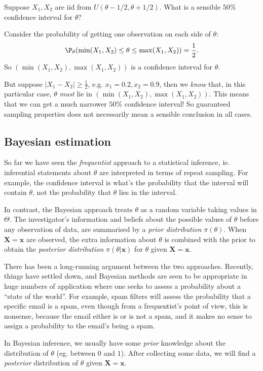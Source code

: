 \documentclass[a4paper]{article}
\begin{document}
\begin{eg}
  Suppose $X_1, X_2$ are iid from $U(\theta - 1/2, \theta + 1/2)$. What is a sensible $50\%$ confidence interval for $\theta$?

  Consider the probability of getting one observation on each side of $\theta$:
  \[
    \P_\theta(\min(X_1, X_2) \leq \theta \leq \max(X_1, X_2)) = \frac{1}{2}.
  \]
  So $(\min(X_1, X_2), \max (X_1, X_2))$ is a confidence interval for $\theta$.

  But suppose $|X_1 - X_2| \geq \frac{1}{2}$, e.g. $x_1 = 0.2, x_2 = 0.9$, then we \emph{know} that, in this particular case, $\theta$ \emph{must} lie in $(\min (X_1, X_2), \max(X_1, X_2))$. This means that we can get a much narrower $50\%$ confidence interval! So guaranteed sampling properties does not necessarily mean a sensible conclusion in all cases.
\end{eg}
\subsection{Bayesian estimation}
So far we have seen the \emph{frequentist} approach to a statistical inference, ie. inferential statements about $\theta$ are interpreted in terms of repeat sampling. For example, the confidence interval is what's the probability that the interval will contain $\theta$, not the probability that $\theta$ lies in the interval.

In contrast, the Bayesian approach treats $\theta$ as a random variable taking values in $\Theta$. The investigator's information and beliefs about the possible values of $\theta$ before any observation of data, are summarised by a \emph{prior distribution} $\pi(\theta)$. When $\mathbf{X} = \mathbf{x}$ are observed, the extra information about $\theta$ is combined with the prior to obtain the \emph{posterior distribution} $\pi(\theta|\mathbf{x})$ for $\theta$ given $\mathbf{X} = \mathbf{x}$.

There has been a long-running argument between the two approaches. Recently, things have settled down, and Bayesian methods are seen to be appropriate in huge numbers of application where one seeks to assess a probability about a ``state of the world''. For example, spam filters will assess the probability that a specific email is a spam, even though from a frequentist's point of view, this is nonsense, because the email either is or is not a spam, and it makes no sense to assign a probability to the email's being a spam.

In Bayesian inference, we usually have some \emph{prior} knowledge about the distribution of $\theta$ (eg. between $0$ and $1$). After collecting some data, we will find a \emph{posterior} distribution of $\theta$ given $\mathbf{X} = \mathbf{x}$.
\end{document}
